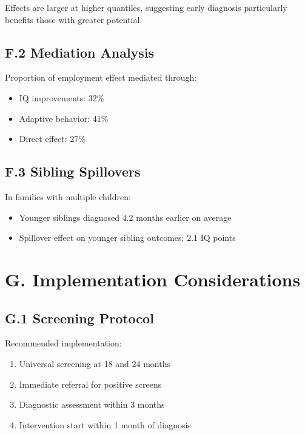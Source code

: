 \documentclass[letterpaper,10pt,english]{jupyterBook}
\begin{document}
\sphinxAtStartPar
Effects are larger at higher quantiles, suggesting early diagnosis particularly benefits those with greater potential.


\subsection{F.2 Mediation Analysis}
\label{\detokenize{appendix:f-2-mediation-analysis}}
\sphinxAtStartPar
Proportion of employment effect mediated through:
\begin{itemize}
\item {} 
\sphinxAtStartPar
IQ improvements: 32\%

\item {} 
\sphinxAtStartPar
Adaptive behavior: 41\%

\item {} 
\sphinxAtStartPar
Direct effect: 27\%

\end{itemize}


\subsection{F.3 Sibling Spillovers}
\label{\detokenize{appendix:f-3-sibling-spillovers}}
\sphinxAtStartPar
In families with multiple children:
\begin{itemize}
\item {} 
\sphinxAtStartPar
Younger siblings diagnosed 4.2 months earlier on average

\item {} 
\sphinxAtStartPar
Spillover effect on younger sibling outcomes: 2.1 IQ points

\end{itemize}


\section{G. Implementation Considerations}
\label{\detokenize{appendix:g-implementation-considerations}}

\subsection{G.1 Screening Protocol}
\label{\detokenize{appendix:g-1-screening-protocol}}
\sphinxAtStartPar
Recommended implementation:
\begin{enumerate}
%
\item {} 
\sphinxAtStartPar
Universal screening at 18 and 24 months

\item {} 
\sphinxAtStartPar
Immediate referral for positive screens

\item {} 
\sphinxAtStartPar
Diagnostic assessment within 3 months

\item {} 
\sphinxAtStartPar
Intervention start within 1 month of diagnosis

\end{enumerate}
\end{document}
